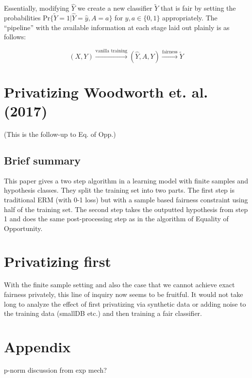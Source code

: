 \documentclass[runningheads]{article}
\newcommand{\1}{\mathbbm{1}}
\theoremstyle{definition}
\begin{document}
Essentially, modifying $\hat{Y}$ we create a new classifier $\tilde{Y}$ that is fair by setting the probabilities $\text{Pr}\{\tilde{Y} = 1 | \hat{Y} = \hat{y}, A = a \}$ for $\hat{y}, a \in \{0,1\}$ appropriately. The ``pipeline'' with the available information at each stage laid out plainly is as follows:

$$(X,Y) \xrightarrow[]{\text{vanilla training}} (\hat{Y},A,Y) \xrightarrow[]{\text{fairness}} \tilde{Y} $$


\section{Privatizing Woodworth et. al. (2017)}
(This is the follow-up to Eq. of Opp.)

\subsection{Brief summary}
This paper gives a two step algorithm in a learning model with finite samples and hypothesis classes. They split the training set into two parts. The first step is traditional ERM (with 0-1 loss) but with a sample based fairness constraint using half of the training set. The second step takes the outputted hypothesis from step 1 and does the same post-processing step as in the algorithm of Equality of Opportunity.


\section{Privatizing first}
With the finite sample setting and also the case that we cannot achieve exact fairness privately, this line of inquiry now seems to be fruitful. It would not take long to analyze the effect of first privatizing via synthetic data or adding noise to the training data (smallDB etc.) and then training a fair classifier. 

\section{Appendix}
p-norm discussion from exp mech?
\end{document}
